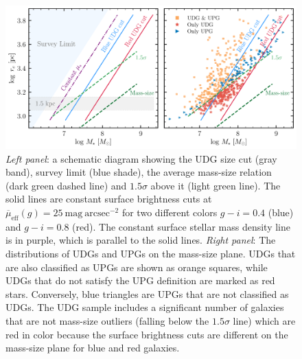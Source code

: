 \documentclass[twocolumn,astrosymb,twocolappendix]{aastex631}
\newcommand{\sbunit}{\mathrm{mag\ arcsec}^{-2}}
\newcommand{\sbeff}{\overline{\mu}_{\mathrm{eff}}(g)}
\begin{document}
\begin{CJK*}{UTF8}{gbsn}
\begin{figure}
	\vbox{ 
		\centering
		\includegraphics[width=1\linewidth]{mass_size_plane_new.pdf}
	}
    \caption{\textit{Left panel}: a schematic diagram showing the UDG size cut (gray band), survey limit (blue shade), the average mass-size relation (dark green dashed line) and $1.5\sigma$ above it (light green line). The solid lines are constant surface brightness cuts at $\sbeff=25\ \sbunit$ for two different colors $g-i=0.4$ (blue) and $g-i=0.8$ (red). The constant surface stellar mass density line is in purple, which is parallel to the solid lines. \textit{Right panel}: The distributions of UDGs and UPGs on the mass-size plane. UDGs that are also classified as UPGs are shown as orange squares, while UDGs that do not satisfy the UPG definition are marked as red stars. Conversely, blue triangles are UPGs that are not classified as UDGs. The UDG sample includes a significant number of galaxies that are not mass-size outliers (falling below the $1.5\sigma$ line) which are red in color because the surface brightness cuts are different on the mass-size plane for blue and red galaxies.
    }
    \label{fig:mass_size}
\end{figure}


\end{CJK*}
\end{document}
